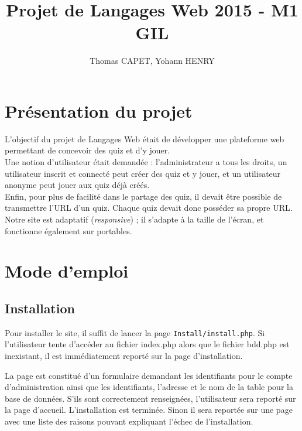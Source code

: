 \documentclass[11pt,titlepage]{article}
\title{Projet de Langages Web 2015 - M1 GIL}
\author{Thomas CAPET, Yohann HENRY}
\begin{document}
\maketitle
\newpage

\tableofcontents
\newpage

\section{Présentation du projet}

L'objectif du projet de Langages Web était de développer une plateforme web permettant de concevoir des quiz et d'y jouer.\\
Une notion d'utilisateur était demandée : l'administrateur a tous les droits, un utilisateur inscrit et connecté peut créer des quiz et y jouer, et un utilisateur anonyme peut jouer aux quiz déjà créés.\\
Enfin, pour plus de facilité dans le partage des quiz, il devait être possible de transmettre l'URL d'un quiz. Chaque quiz devait donc posséder sa propre URL.
\medbreak
Notre site est adaptatif (\textit{responsive}) ; il s'adapte à la taille de l'écran, et fonctionne également sur portables.


\section{Mode d'emploi}
\subsection{Installation}
Pour installer le site, il suffit de lancer la page \texttt{Install/install.php}. 
Si l'utilisateur tente d'accéder au fichier index.php alors que le fichier bdd.php est inexistant, 
il est immédiatement reporté sur la page d'installation.

La page est constitué d'un formulaire demandant les identifiants pour le compte d'administration ainsi que les identifiants, 
l'adresse et le nom de la table pour la base de données.
S'ils sont correctement renseignées, l'utilisateur sera reporté sur la page d'accueil. L'installation est terminée.
Sinon il sera reportée sur une page avec une liste des raisons pouvant expliquant l'échec de l'installation.
\end{document}
